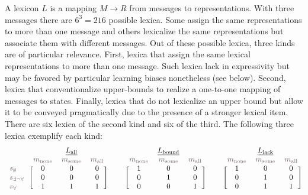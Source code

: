 \documentclass[a4paper, 11pt]{article}
\theoremstyle{Satz}
\newcommand{\state}{\ensuremath{s}\xspace}		%
\newcommand{\mystate}[1]{\ensuremath{\state_{\text{#1}}}\xspace} %
\newcommand{\mylang}[1]{\ensuremath{L_{\text{#1}}}\xspace} %
\newcommand{\Messgs}{\ensuremath{M}\xspace}		%
\newcommand{\messg}{\ensuremath{m}\xspace}		%
\newcommand{\mymessg}[1]{\ensuremath{\messg_{\text{#1}}}\xspace} %
\newcommand{\ssome}{\mystate{\ensuremath{\exists\neg\forall}}}
\newcommand{\sall}{\mystate{\ensuremath{\forall}}}
\newcommand{\snone}{\mystate{\ensuremath{\emptyset}}}
\newcommand{\msome}{\mymessg{some}}
\newcommand{\mall}{\mymessg{all}}
\newcommand{\mnone}{\mymessg{none}}
\newcommand{\Lall}{\mylang{all}}
\newcommand{\Lbound}{\mylang{bound}}
\newcommand{\Llack}{\mylang{lack}}
\newcommand{\mygray}[1]{{\textcolor{mygray}{#1}}}
\begin{document}
A lexicon $L$ is a mapping $\Messgs \rightarrow R$ from messages to representations. With three
messages there are $6^3 = 216$ possible lexica. Some assign the same representations to more
than one message and others lexicalize the same representations but associate them with
different messages. Out of these possible lexica, three kinds are of particular
relevance. First, lexica that assign the same lexical representations to more than one
message. Such lexica lack in expressivity but may be favored by particular learning biases
nonetheless (see below). Second, lexica that conventionalize upper-bounds to realize a
one-to-one mapping of messages to states. Finally, lexica that do not lexicalize an upper
bound but allow it to be conveyed pragmatically due to the presence of a stronger lexical
item. There are six lexica of the second kind and six of the third.  The following three lexica
exemplify each kind:
\begin{align*}
  \begin{blockarray}{lccc}
    & & \underline{\Lall} & \\
    & \mygray{\mnone} & \mygray{\msome} & \mygray{\mall} \\
    \begin{block}{l[ccc]}
     \mygray{\snone}  & 0 & 0 & 0\\
     \mygray{\ssome}  & 0 & 0 & 0\\
    \mygray{\sall}   & 1 & 1 & 1\\
    \end{block}
  \end{blockarray} & &
 \begin{blockarray}{lccc}
    & & \underline{\Lbound} & \\
    & \mygray{\mnone} & \mygray{\msome} & \mygray{\mall} \\
    \begin{block}{l[ccc]}
       & 1 & 0 & 0\\
       & 0 & 1 & 0\\
       & 0 & 0 & 1\\
    \end{block}
  \end{blockarray} & &
  \begin{blockarray}{lccc}
    & & \underline{\Llack} & \\
    & \mygray{\mnone} & \mygray{\msome} & \mygray{\mall} \\
    \begin{block}{l[ccc]}
       & 1 & 0 & 0\\
       & 0 & 1 & 0\\
       & 0 & 1 & 1\\
    \end{block}
  \end{blockarray}
\end{align*}
\end{document}
